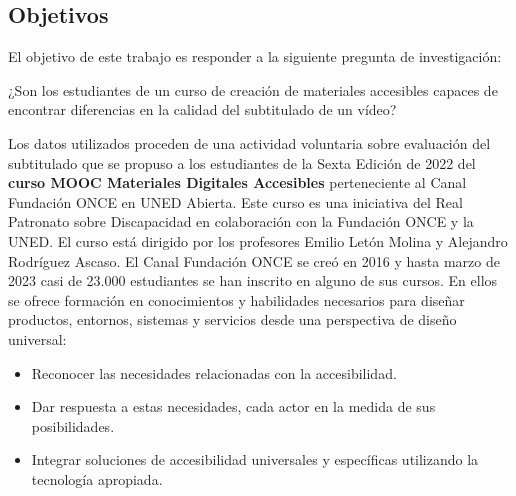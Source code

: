 \documentclass[
  letterpaper,
  DIV=11,
  numbers=noendperiod]{scrartcl}
\providecommand{\tightlist}{%
  \setlength{\itemsep}{0pt}\setlength{\parskip}{0pt}}\usepackage{longtable,booktabs,array}
\begin{document}
\hypertarget{sec-objetivos}{%
\subsection{Objetivos}\label{sec-objetivos}}

El objetivo de este trabajo es responder a la siguiente pregunta de
investigación:

\begin{tcolorbox}[enhanced jigsaw, titlerule=0mm, toptitle=1mm, bottomrule=.15mm, bottomtitle=1mm, breakable, opacityback=0, colback=white, rightrule=.15mm, leftrule=.75mm, coltitle=black, opacitybacktitle=0.6, colbacktitle=quarto-callout-note-color!10!white, title=\textcolor{quarto-callout-note-color}{\faInfo}\hspace{0.5em}{Pregunta de investigación}, colframe=quarto-callout-note-color-frame, arc=.35mm, toprule=.15mm, left=2mm]

¿Son los estudiantes de un curso de creación de materiales accesibles
capaces de encontrar diferencias en la calidad del subtitulado de un
vídeo?

\end{tcolorbox}

Los datos utilizados proceden de una actividad voluntaria sobre
evaluación del subtitulado que se propuso a los estudiantes de la Sexta
Edición de 2022 del \textbf{curso MOOC Materiales Digitales Accesibles}
perteneciente al Canal Fundación ONCE en UNED Abierta. Este curso es una
iniciativa del Real Patronato sobre Discapacidad en colaboración con la
Fundación ONCE y la UNED. El curso está dirigido por los profesores
Emilio Letón Molina y Alejandro Rodríguez Ascaso. El Canal Fundación
ONCE se creó en 2016 y hasta marzo de 2023 casi de 23.000 estudiantes se
han inscrito en alguno de sus cursos. En ellos se ofrece formación en
conocimientos y habilidades necesarios para diseñar productos, entornos,
sistemas y servicios desde una perspectiva de diseño universal:

\begin{itemize}
\tightlist
\item
  Reconocer las necesidades relacionadas con la accesibilidad.
\item
  Dar respuesta a estas necesidades, cada actor en la medida de sus
  posibilidades.
\item
  Integrar soluciones de accesibilidad universales y específicas
  utilizando la tecnología apropiada.
\end{itemize}
\end{document}
